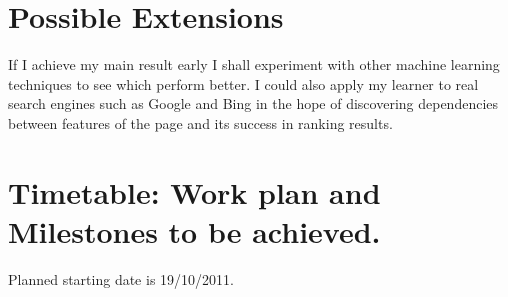 \section*{\bf Possible Extensions}
If I achieve my main result early I shall experiment with other machine learning techniques to see which perform better. I could also apply my learner to real search engines such as Google and Bing in the hope of 
discovering dependencies between features of the page and its success in ranking results.
\section*{\bf Timetable: Work plan and Milestones to be achieved.}


Planned starting date is 19/10/2011.

\begin{enumerate}


\end{enumerate}
